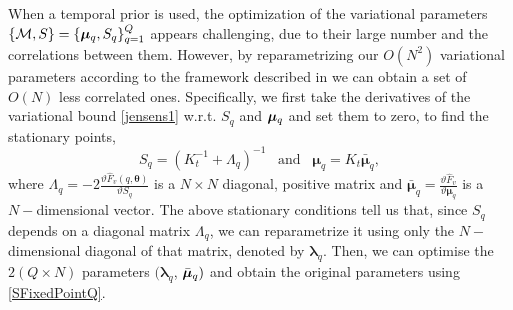 \documentclass [10pt , a4paper]{article}
\begin{document}
When a temporal prior is used, the optimization of the variational parameters 
$\{ \mathcal{M}, S \} = \{ \boldsymbol \mu_q, S_q \}_{q=1}^Q$ appears challenging, due to
their large number and the correlations between them. However, by
reparametrizing our $O \left( N^2 \right)$ variational parameters
according to the framework described in
\cite{OpperFixedPointCovariance} we can obtain a set of $O(N)$ less
correlated ones. Specifically, we first take the
derivatives of the variational bound \eqref{jensens1} w.r.t. $S_q$ and
$\boldsymbol \mu_q$ and set them to zero, to find the stationary
points,
\begin{equation}
S_q = \left( \mathit{K}_t^{-1} + \Lambda_q \right)^{-1} \;\;\; \text{and}  \;\;\;  \boldsymbol \mu_q = K_t \bar{\boldsymbol \mu}_q, \label{SFixedPointQ}
\end{equation}
where $\Lambda_q = - 2\frac{\vartheta \mathit{\hat{F}_v(q, \boldsymbol
    \theta)}}{\vartheta \mathit{S_q}}$ is a $N \times N$ diagonal,
positive matrix and $\bar{\boldsymbol \mu}_q = \frac{\vartheta
  \hat{F}_v}{\vartheta \boldsymbol \mu_q}$ is a $N-$dimensional
vector.
The above stationary conditions tell us that, since $S_q$ depends on a
diagonal matrix $\Lambda_q$, we can reparametrize it using only the
$N-$dimensional diagonal of that matrix, denoted by $\boldsymbol
\lambda_q$.  Then, we can optimise the $2 (Q \times N)$ parameters $(
\boldsymbol \lambda_q$, $\bar{\boldsymbol \mu}_q)$ and obtain the original
parameters using \eqref{SFixedPointQ}.





\end{document}
